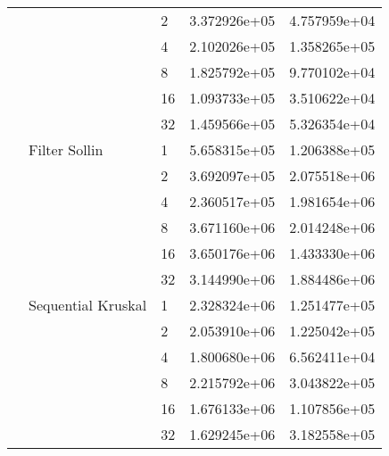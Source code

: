 \begin{tabular}{lllrr}
                                                       &                     & 2  &  3.372926e+05 &  4.757959e+04 \\
                                                       &                     & 4  &  2.102026e+05 &  1.358265e+05 \\
                                                       &                     & 8  &  1.825792e+05 &  9.770102e+04 \\
                                                       &                     & 16 &  1.093733e+05 &  3.510622e+04 \\
                                                       &                     & 32 &  1.459566e+05 &  5.326354e+04 \\
                                                       & Filter Sollin & 1  &  5.658315e+05 &  1.206388e+05 \\
                                                       &                     & 2  &  3.692097e+05 &  2.075518e+06 \\
                                                       &                     & 4  &  2.360517e+05 &  1.981654e+06 \\
                                                       &                     & 8  &  3.671160e+06 &  2.014248e+06 \\
                                                       &                     & 16 &  3.650176e+06 &  1.433330e+06 \\
                                                       &                     & 32 &  3.144990e+06 &  1.884486e+06 \\
                                                       & Sequential Kruskal & 1  &  2.328324e+06 &  1.251477e+05 \\
                                                       &                     & 2  &  2.053910e+06 &  1.225042e+05 \\
                                                       &                     & 4  &  1.800680e+06 &  6.562411e+04 \\
                                                       &                     & 8  &  2.215792e+06 &  3.043822e+05 \\
                                                       &                     & 16 &  1.676133e+06 &  1.107856e+05 \\
                                                       &                     & 32 &  1.629245e+06 &  3.182558e+05 \\

\end{tabular}
